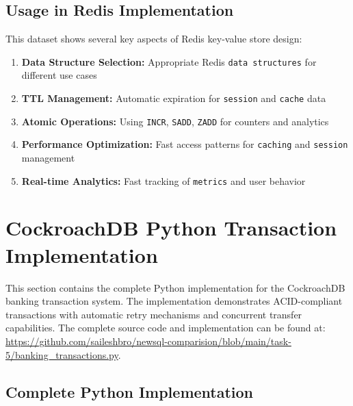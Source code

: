\subsection{Usage in Redis Implementation}

This dataset shows several key aspects of Redis key-value store design:

\begin{enumerate}
    \item \textbf{Data Structure Selection:} Appropriate Redis \texttt{data structures} for different use cases
    \item \textbf{TTL Management:} Automatic expiration for \texttt{session} and \texttt{cache} data
    \item \textbf{Atomic Operations:} Using \texttt{INCR}, \texttt{SADD}, \texttt{ZADD} for counters and analytics
    \item \textbf{Performance Optimization:} Fast access patterns for \texttt{caching} and \texttt{session} management
    \item \textbf{Real-time Analytics:} Fast tracking of \texttt{metrics} and user behavior
\end{enumerate}

\section{CockroachDB Python Transaction Implementation}

This section contains the complete Python implementation for the CockroachDB banking transaction system. The implementation demonstrates ACID-compliant transactions with automatic retry mechanisms and concurrent transfer capabilities. The complete source code and implementation can be found at: \url{https://github.com/saileshbro/newsql-comparision/blob/main/task-5/banking_transactions.py}.

\subsection{Complete Python Implementation}

